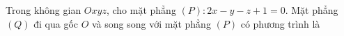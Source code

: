 \begin{ex}
Trong không gian $Oxyz$, cho mặt phẳng $(P)\colon 2x-y-z+1=0$. Mặt phẳng $(Q)$ đi qua gốc $O$ và song song với mặt phẳng $(P)$ có phương trình là
\end{ex}
